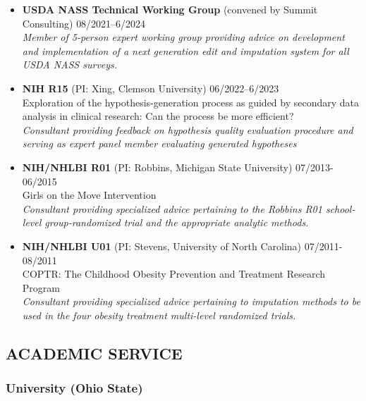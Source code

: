 \documentclass[
  english,
  letterpaper,
  DIV=11,
  numbers=noendperiod]{scrartcl}
\providecommand{\tightlist}{%
  \setlength{\itemsep}{0pt}\setlength{\parskip}{0pt}}
\begin{document}
\begin{itemize}
\tightlist
\item
  \textbf{USDA NASS Technical Working Group} (convened by Summit
  Consulting) {08/2021--6/2024}\\
  \emph{Member of 5-person expert working group providing advice on
  development and implementation of a next generation edit and
  imputation system for all USDA NASS surveys.}
\item
  \textbf{NIH R15} (PI: Xing, Clemson University) {06/2022--6/2023}\\
  Exploration of the hypothesis-generation process as guided by
  secondary data analysis in clinical research: Can the process be more
  efficient?\\
  \emph{Consultant providing feedback on hypothesis quality evaluation
  procedure and serving as expert panel member evaluating generated
  hypotheses}
\item
  \textbf{NIH/NHLBI R01} (PI: Robbins, Michigan State University)
  {07/2013-06/2015}\\
  Girls on the Move Intervention\\
  \emph{Consultant providing specialized advice pertaining to the
  Robbins R01 school-level group-randomized trial and the appropriate
  analytic methods.}
\item
  \textbf{NIH/NHLBI U01} (PI: Stevens, University of North Carolina)
  {07/2011-08/2011}\\
  COPTR: The Childhood Obesity Prevention and Treatment Research
  Program\\
  \emph{Consultant providing specialized advice pertaining to imputation
  methods to be used in the four obesity treatment multi-level
  randomized trials.}
\end{itemize}

\subsection{ACADEMIC SERVICE}\label{academic-service}

\subsubsection{University (Ohio State)}\label{university-ohio-state}
\end{document}

